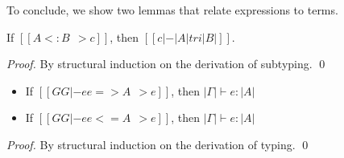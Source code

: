 To conclude, we show two lemmas that relate \name expressions
to \tname terms.

\begin{lemma}
  If $[[A <: B ~~> c]]$, then $[[c |-  |A| tri |B|]]$.
  \label{lemma:sub-correct}
\end{lemma}
\begin{proof}
  By structural induction on the derivation of subtyping. \qed
\end{proof}


\begin{lemma}  \leavevmode
  \begin{itemize}
  \item If $[[GG |- ee => A ~~> e]]$, then $|\Gamma| \vdash e : |A| $
  \item If $[[GG |- ee <= A ~~> e]]$, then $|\Gamma| \vdash e : |A| $
  \end{itemize}
\end{lemma}
\begin{proof}
  By structural induction on the derivation of typing. \qed
\end{proof}


\renewcommand{\hlmath}[1]{#1}


